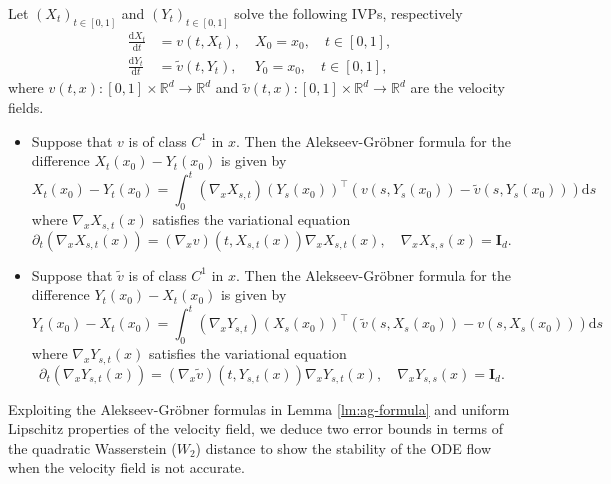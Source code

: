 \documentclass[twoside,11pt]{article}
\def\rmI{{\mathbf{I}}}
\def\sR{{\mathbb{R}}}
\newcommand{\diff}{\mathrm{d}}
\numberwithin{equation}{section}
\begin{document}
\begin{lemma} \cite[Theorem 14.5]{hairer1993classical} \label{lm:ag-formula}
Let $(X_t)_{t \in [0, 1]}$ and $(Y_t)_{t \in [0, 1]}$ solve the following IVPs, respectively
\begin{align*}
    \frac{\diff X_t}{\diff t} &= v(t, X_t), \quad X_0 = x_0, \quad t \in [0, 1], \\
    \frac{\diff Y_t}{\diff t} &= \tilde{v}(t, Y_t), \quad~ Y_0 = x_0, \quad t \in [0, 1],
\end{align*}
where $v(t, x): [0, 1] \times \sR^d \to \sR^d$ and $\tilde{v}(t, x): [0, 1] \times \sR^d \to \sR^d$ are the velocity fields.
\begin{itemize}
\item[(i)] Suppose that $v$ is of class $C^1$ in $x$. Then the Alekseev-Gr{\"o}bner formula for the difference $X_t(x_0) - Y_t(x_0)$ is given by
\begin{equation}
    \label{eq:perb-vf-x}
    X_t(x_0) - Y_t(x_0) = \int_0^t (\nabla_x X_{s,t}) (Y_s(x_0))^{\top} \left( v(s, Y_s(x_0)) - \tilde{v}(s, Y_s(x_0)) \right) \diff s
\end{equation}
where $\nabla_x X_{s,t}(x)$ satisfies the variational equation
\begin{equation}
    \label{eq:vari-eq-x}
    \partial_t (\nabla_x X_{s,t}(x)) = (\nabla_x v) (t, X_{s,t}(x)) \nabla_x X_{s,t}(x), \quad \nabla_x X_{s,s}(x) = \rmI_d.
\end{equation}
\item[(ii)] Suppose that $\tilde{v}$ is of class $C^1$ in $x$. Then the Alekseev-Gr{\"o}bner formula for the difference $Y_t(x_0) - X_t(x_0)$ is given by
\begin{equation}
    \label{eq:perb-vf-y}
    Y_t(x_0) - X_t(x_0) = \int_0^t (\nabla_x Y_{s,t}) (X_s(x_0))^{\top} \left( \tilde{v}(s, X_s(x_0)) - v(s, X_s(x_0)) \right) \diff s
\end{equation}
where $\nabla_x Y_{s,t}(x)$ satisfies the variational equation
\begin{equation}
    \label{eq:vari-eq-y}
    \partial_t (\nabla_x Y_{s,t}(x)) = (\nabla_x \tilde{v}) (t, Y_{s,t}(x)) \nabla_x Y_{s,t}(x), \quad \nabla_x Y_{s,s}(x) = \rmI_d.
\end{equation}
\end{itemize}
\end{lemma}


Exploiting the Alekseev-Gr{\"o}bner formulas in Lemma \ref{lm:ag-formula} and uniform Lipschitz properties of the velocity field, we deduce two error bounds in terms of the quadratic Wasserstein ($W_2$) distance to show the stability of the ODE flow when the velocity field is not accurate.
\end{document}
